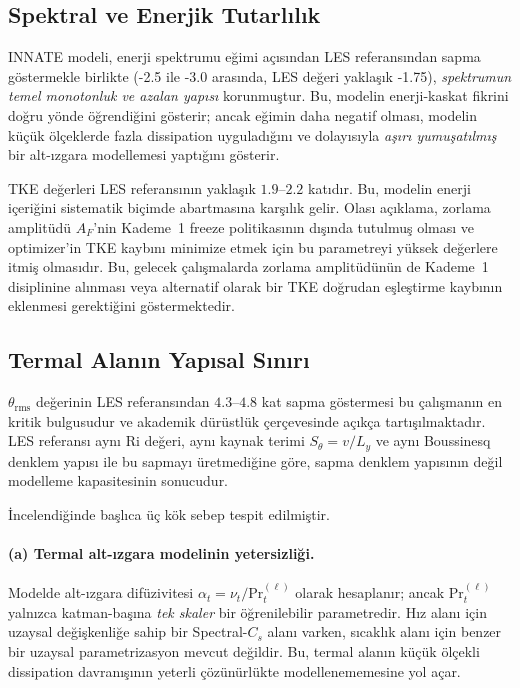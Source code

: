\subsection{Spektral ve Enerjik Tutarlılık}

INNATE modeli, enerji spektrumu eğimi açısından LES referansından sapma göstermekle birlikte (-2.5 ile -3.0 arasında, LES değeri yaklaşık -1.75), \emph{spektrumun temel monotonluk ve azalan yapısı} korunmuştur. Bu, modelin enerji-kaskat fikrini doğru yönde öğrendiğini gösterir; ancak eğimin daha negatif olması, modelin küçük ölçeklerde fazla dissipation uyguladığını ve dolayısıyla \emph{aşırı yumuşatılmış} bir alt-ızgara modellemesi yaptığını gösterir.

TKE değerleri LES referansının yaklaşık $1.9$--$2.2$ katıdır. Bu, modelin enerji içeriğini sistematik biçimde abartmasına karşılık gelir. Olası açıklama, zorlama amplitüdü $A_{F}$'nin Kademe~1 freeze politikasının dışında tutulmuş olması ve optimizer'in TKE kaybını minimize etmek için bu parametreyi yüksek değerlere itmiş olmasıdır. Bu, gelecek çalışmalarda zorlama amplitüdünün de Kademe~1 disiplinine alınması veya alternatif olarak bir TKE doğrudan eşleştirme kaybının eklenmesi gerektiğini göstermektedir.

\subsection{Termal Alanın Yapısal Sınırı}
\label{sec:termal_sinir}

$\theta_{\mathrm{rms}}$ değerinin LES referansından $4.3$--$4.8$ kat sapma göstermesi bu çalışmanın en kritik bulgusudur ve akademik dürüstlük çerçevesinde açıkça tartışılmaktadır. LES referansı aynı $\mathrm{Ri}$ değeri, aynı kaynak terimi $S_{\theta}=v/L_{y}$ ve aynı Boussinesq denklem yapısı ile bu sapmayı üretmediğine göre, sapma denklem yapısının değil modelleme kapasitesinin sonucudur.

İncelendiğinde başlıca üç kök sebep tespit edilmiştir.

\paragraph{(a) Termal alt-ızgara modelinin yetersizliği.} Modelde alt-ızgara difüzivitesi $\alpha_{t}=\nu_{t}/\mathrm{Pr}_{t}^{(\ell)}$ olarak hesaplanır; ancak $\mathrm{Pr}_{t}^{(\ell)}$ yalnızca katman-başına \emph{tek skaler} bir öğrenilebilir parametredir. Hız alanı için uzaysal değişkenliğe sahip bir Spectral-$C_{s}$ alanı varken, sıcaklık alanı için benzer bir uzaysal parametrizasyon mevcut değildir. Bu, termal alanın küçük ölçekli dissipation davranışının yeterli çözünürlükte modellenememesine yol açar.

